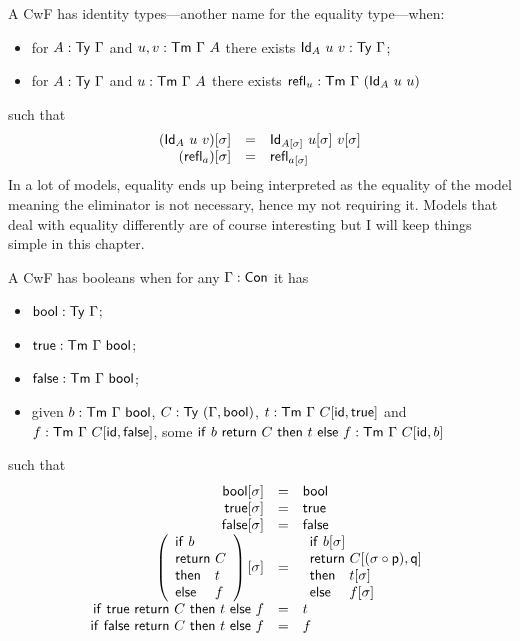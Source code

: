 
A \acrshort{CwF} has identity types---another name for the equality type---when:
\begin{itemize}
  \item for \(A : \mathsf{Ty}\ \Gamma\) and \(u, v : \mathsf{Tm}\ \Gamma\ A\) there exists
  \(\mathsf{Id}_A\ u\ v : \mathsf{Ty}\ \Gamma\);
  \item for \(A : \mathsf{Ty}\ \Gamma\) and \(u : \mathsf{Tm}\ \Gamma\ A\) there exists
  \(\crefl_u : \CTm\ \Ga\ (\CId_A\ u\ u)\)
\end{itemize}
such that
\[
  \begin{array}{rcl}
    (\CId_A\ u\ v)[\sigma] &=& \CId_{A[\sigma]}\ u[\sigma]\ v[\sigma] \\
    (\crefl_a)[\sigma] &=& \crefl_{a[\sigma]}
  \end{array}
\]
In a lot of models, equality ends up being interpreted as the equality of the
model meaning the eliminator is not necessary, hence my not requiring it.
Models that deal with equality differently are of course interesting but I
will keep things simple in this chapter.


A \acrshort{CwF} has booleans when for any \(\Gamma : \mathsf{Con}\) it has
\begin{itemize}
  \item \(\mathsf{bool} : \mathsf{Ty}\ \Gamma\);
  \item \(\ttrue : \CTm\ \Ga\ \bool\);
  \item \(\ffalse : \CTm\ \Ga\ \bool\);
  \item given \(b : \mathsf{Tm}\ \Gamma\ \mathsf{bool}\), \(C : \mathsf{Ty}\ (\Gamma, \mathsf{bool})\),
  \(t : \mathsf{Tm}\ \Gamma\ C[\mathsf{id}, \mathsf{true}]\) and \(f : \mathsf{Tm}\ \Gamma\ C[\mathsf{id}, \mathsf{false}]\),
  some \(\mathsf{if}\ b\ \mathsf{return}\ C\ \mathsf{then}\ t\ \mathsf{else}\ f : \mathsf{Tm}\ \Gamma\ C[\mathsf{id}, b]\)
\end{itemize}
such that
\[
  \begin{array}{rcl}
    \bool[\sigma] &=& \bool \\
    \ttrue[\sigma] &=& \ttrue \\
    \ffalse[\sigma] &=& \ffalse \\
    \left(\fitif{b}{C}{t}{f}\right)[\sigma] &=&
    \fitif{b[\sigma]}{C[(\sigma \circ \pp), \pq]}{t[\sigma]}{f[\sigma]} \\
    \tif{\ttrue}{C}{t}{f} &=& t \\
    \tif{\ffalse}{C}{t}{f} &=& f
  \end{array}
\]


